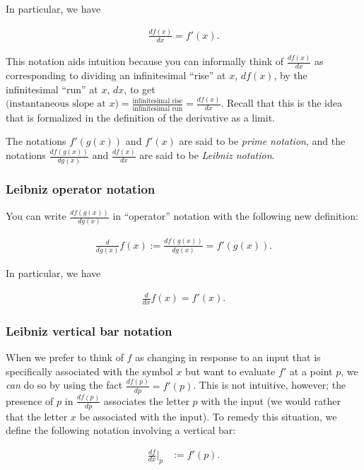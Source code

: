 In particular, we have

\begin{align*}
    \frac{df(x)}{dx} = f'(x).
\end{align*}

This notation aids intuition because you can informally think of $\frac{df(x)}{dx}$ as corresponding to dividing an infinitesimal ``rise'' at $x$, $df(x)$, by the infinitesimal ``run'' at $x$, $dx$, to get $(\text{instantaneous slope at $x$)} = \frac{\text{infinitesimal rise}}{\text{infinitesimal run}} = \frac{df(x)}{dx}$. Recall that this is the idea that is formalized in the definition of the derivative as a limit.

The notations $f'(g(x))$ and $f'(x)$ are said to be \textit{prime notation}, and the notations $\frac{df(g(x))}{dg(x)}$ and $\frac{df(x)}{dx}$ are said to be \textit{Leibniz notation}.

\subsubsection*{Leibniz operator notation}
         
You can write $\frac{df(g(x))}{dg(x)}$ in ``operator'' notation with the following new definition:

\begin{align*}
    \frac{d}{dg(x)}f(x) := \frac{df(g(x))}{dg(x)} = f'(g(x)).
\end{align*}

In particular, we have

\begin{align*}
    \frac{d}{dx}f(x) = f'(x).
\end{align*}

\subsubsection*{Leibniz vertical bar notation}

When we prefer to think of $f$ as changing in response to an input that is specifically associated with the symbol $x$ but want to evaluate $f'$ at a point $p$, we \textit{can} do so by using the fact $\frac{df(p)}{dp} = f'(p)$. This is not intuitive, however; the presence of $p$ in $\frac{df(p)}{dp}$ associates the letter $p$ with the input (we would rather that the letter $x$ be associated with the input). To remedy this situation, we define the following notation involving a vertical bar:

\begin{align*}
    \frac{df}{dx}\Big|_p &:= f'(p).
\end{align*}


